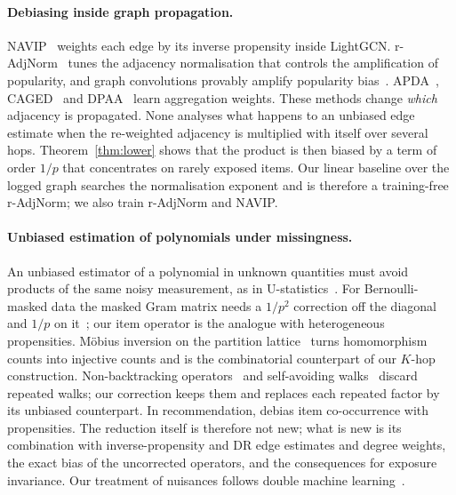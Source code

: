 \paragraph{Debiasing inside graph propagation.}
NAVIP~\citep{kim2022navip} weights each edge by its inverse propensity inside
LightGCN. r-AdjNorm~\citep{zhao2022radjnorm} tunes the adjacency normalisation
that controls the amplification of popularity, and graph convolutions provably
amplify popularity bias~\citep{chen2024gcnpop}. APDA~\citep{zhou2023apda},
CAGED~\citep{que2025caged} and DPAA~\citep{dpaa2026} learn aggregation weights.
These methods change \emph{which} adjacency is propagated. None analyses what
happens to an unbiased edge estimate when the re-weighted adjacency is multiplied
with itself over several hops. Theorem~\ref{thm:lower} shows that the product is
then biased by a term of order $1/p$ that concentrates on rarely exposed items.
Our linear baseline over the logged graph searches the normalisation exponent and
is therefore a training-free r-AdjNorm; we also train r-AdjNorm and NAVIP.

\paragraph{Unbiased estimation of polynomials under missingness.}
An unbiased estimator of a polynomial in unknown quantities must avoid products of
the same noisy measurement, as in U-statistics~\citep{hoeffding1948}. For
Bernoulli-masked data the masked Gram matrix needs a $1/p^2$ correction off the
diagonal and $1/p$ on it~\citep{lounici2014}; our item operator is the analogue
with heterogeneous propensities. Möbius inversion on the partition
lattice~\citep{rota1964} turns homomorphism counts into injective counts and is
the combinatorial counterpart of our $K$-hop construction. Non-backtracking
operators~\citep{krzakala2013} and self-avoiding walks~\citep{hopkins2017bayesian}
discard repeated walks; our correction keeps them and replaces each repeated
factor by its unbiased counterpart. In recommendation,
\citet{schnabel2020item} debias item co-occurrence with propensities. The
reduction itself is therefore not new; what is new is its combination with
inverse-propensity and DR edge estimates and degree weights, the exact bias of the
uncorrected operators, and the consequences for exposure invariance. Our
treatment of nuisances follows double machine learning~\citep{chernozhukov2018dml}.

